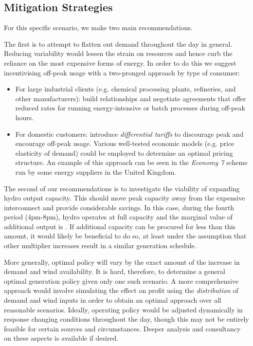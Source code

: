 \documentclass[twocolumn]{article}
\begin{document}
    \subsection{Mitigation Strategies}
    	
        For this specific scenario, we make two main recommendations.
        
        The first is to attempt to flatten out demand throughout the day in general.  Reducing variability would lessen the strain on resources and hence curb the reliance on the most expensive forms of energy.  In order to do this we suggest incentivising off-peak usage with a two-pronged approach by type of consumer:
        
        \begin{itemize}
        	
            \item For large industrial clients (e.g. chemical processing plants, refineries, and other manufacturers): build relationships and negotiate agreements that offer reduced rates for running energy-intensive or batch processes during off-peak hours.
 			
            \item For domestic customers: introduce \textit{differential tariffs} to discourage peak and encourage off-peak usage.  Various well-tested economic models (e.g. price elasticity of demand) could be employed to determine an optimal pricing structure.  An example of this approach can be seen in the \textit{Economy 7} scheme run by some energy suppliers in the United Kingdom.
            
        \end{itemize}
        
        The second of our recommendations is to investigate the viability of expanding hydro output capacity.  This should move peak capacity away from the expensive interconnect and provide considerable savings.  In this case, during the fourth period (4pm-8pm), hydro operates at full capacity and the marginal value of additional output is . If additional capacity can be procured for less than this amount, it would likely be beneficial to do so, at least under the assumption that other multiplier increases result in a similar generation schedule.
    
    More generally, optimal policy will vary by the exact amount of the increase in demand and wind availability.  It is hard, therefore, to determine a general optimal generation policy given only one such scenario.  A more comprehensive approach would involve simulating the effect on profit using the \textit{distribution} of demand and wind inputs in order to obtain an optimal approach over all reasonable scenarios.  Ideally, operating policy would be adjusted dynamically in response changing conditions throughout the day, though this may not be entirely feasible for certain sources and circumstances.  Deeper analysis and consultancy on these aspects is available if desired.
    
\end{document}
